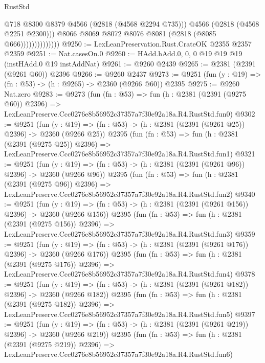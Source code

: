 \begin{lexlean}{RustStd}
\begin{coremodule}
                                @718
                                @8300
                                @8379
                                @4566
                                (@2818 (@4568 @2294 @735)))
                              @4566
                              (@2818 (@4568 @2251 @2300)))
                            @8066
                            @8069
                            @8072
                            @8076
                            @8081
                            (@2818 (@8085 @666))))))))))))))
@9250 := LexLeanPreservation.Rust.CrateOK @2355 @2357 @2359
@9251 := Nat.casesOn.{0}
@9260 := HAdd.hAdd.{0, 0, 0} @19 @19 @19 (instHAdd.{0} @19 instAddNat)
@9261 := @9260 @2439
@9265 := @2381 (@2391 (@9261 @60)) @2396
@9266 := @9260 @2437
@9273 := @9251 (fun (y : @19) => (fn : @53) -> (h : @9265) -> @2360 (@9266 @60)) @2395
@9275 := @9260 Nat.zero
@9283 := @9273
    (fun (fn : @53) =>
    fun (h : @2381 (@2391 (@9275 @60)) @2396) =>
    LexLeanPreserve.Ccc0276e8b56952c37357a7f30e92a18a.R4.RustStd.fun0)
@9302 := @9251
    (fun (y : @19) => (fn : @53) -> (h : @2381 (@2391 (@9261 @25)) @2396) -> @2360 (@9266 @25))
    @2395
    (fun (fn : @53) =>
    fun (h : @2381 (@2391 (@9275 @25)) @2396) =>
    LexLeanPreserve.Ccc0276e8b56952c37357a7f30e92a18a.R4.RustStd.fun1)
@9321 := @9251
    (fun (y : @19) => (fn : @53) -> (h : @2381 (@2391 (@9261 @96)) @2396) -> @2360 (@9266 @96))
    @2395
    (fun (fn : @53) =>
    fun (h : @2381 (@2391 (@9275 @96)) @2396) =>
    LexLeanPreserve.Ccc0276e8b56952c37357a7f30e92a18a.R4.RustStd.fun2)
@9340 := @9251
    (fun (y : @19) => (fn : @53) -> (h : @2381 (@2391 (@9261 @156)) @2396) -> @2360 (@9266 @156))
    @2395
    (fun (fn : @53) =>
    fun (h : @2381 (@2391 (@9275 @156)) @2396) =>
    LexLeanPreserve.Ccc0276e8b56952c37357a7f30e92a18a.R4.RustStd.fun3)
@9359 := @9251
    (fun (y : @19) => (fn : @53) -> (h : @2381 (@2391 (@9261 @176)) @2396) -> @2360 (@9266 @176))
    @2395
    (fun (fn : @53) =>
    fun (h : @2381 (@2391 (@9275 @176)) @2396) =>
    LexLeanPreserve.Ccc0276e8b56952c37357a7f30e92a18a.R4.RustStd.fun4)
@9378 := @9251
    (fun (y : @19) => (fn : @53) -> (h : @2381 (@2391 (@9261 @182)) @2396) -> @2360 (@9266 @182))
    @2395
    (fun (fn : @53) =>
    fun (h : @2381 (@2391 (@9275 @182)) @2396) =>
    LexLeanPreserve.Ccc0276e8b56952c37357a7f30e92a18a.R4.RustStd.fun5)
@9397 := @9251
    (fun (y : @19) => (fn : @53) -> (h : @2381 (@2391 (@9261 @219)) @2396) -> @2360 (@9266 @219))
    @2395
    (fun (fn : @53) =>
    fun (h : @2381 (@2391 (@9275 @219)) @2396) =>
    LexLeanPreserve.Ccc0276e8b56952c37357a7f30e92a18a.R4.RustStd.fun6)

\end{coremodule}
\end{lexlean}
